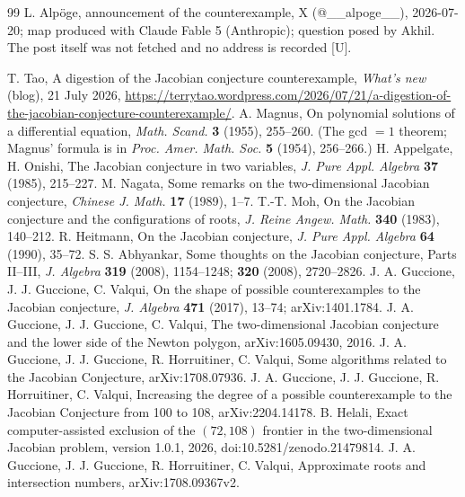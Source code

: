 \documentclass[11pt]{article}
\theoremstyle{remark}
\begin{document}
\small
\begin{thebibliography}{99}
 L. Alp\"oge, announcement of the counterexample, X (@\_\_alpoge\_\_),
2026-07-20; map produced with Claude Fable 5 (Anthropic); question posed by Akhil. The post itself was not fetched and no address is recorded [U]. %
 \raggedright T. Tao, A digestion of the Jacobian conjecture counterexample, \emph{What's new} (blog), 21 July
2026, \url{https://terrytao.wordpress.com/2026/07/21/a-digestion-of-the-jacobian-conjecture-counterexample/}.
 A. Magnus, On polynomial solutions of a differential equation,
\emph{Math. Scand.} \textbf{3} (1955), 255--260. (The gcd $=1$ theorem; Magnus' formula is
in \emph{Proc. Amer. Math. Soc.} \textbf{5} (1954), 256--266.)
 H. Appelgate, H. Onishi, The Jacobian conjecture in two
variables, \emph{J. Pure Appl. Algebra} \textbf{37} (1985), 215--227.
 M. Nagata, Some remarks on the two-dimensional Jacobian conjecture,
\emph{Chinese J. Math.} \textbf{17} (1989), 1--7.
 T.-T. Moh, On the Jacobian conjecture and the configurations of roots,
\emph{J. Reine Angew. Math.} \textbf{340} (1983), 140--212.
 R. Heitmann, On the Jacobian conjecture, \emph{J. Pure Appl.
Algebra} \textbf{64} (1990), 35--72.
 S. S. Abhyankar, Some thoughts on the Jacobian conjecture, Parts
II--III, \emph{J. Algebra} \textbf{319} (2008), 1154--1248; \textbf{320} (2008),
2720--2826.
 J. A. Guccione, J. J. Guccione, C. Valqui, On the shape of possible
counterexamples to the Jacobian conjecture, \emph{J. Algebra} \textbf{471} (2017), 13--74;
arXiv:1401.1784.
 J. A. Guccione, J. J. Guccione, C. Valqui, The two-dimensional Jacobian
conjecture and the lower side of the Newton polygon, arXiv:1605.09430, 2016.
 J. A. Guccione, J. J. Guccione, R. Horruitiner, C. Valqui, Some
algorithms related to the Jacobian Conjecture, arXiv:1708.07936.
 J. A. Guccione, J. J. Guccione, R. Horruitiner, C. Valqui, Increasing
the degree of a possible counterexample to the Jacobian Conjecture from 100 to 108,
arXiv:2204.14178.
 B. Helali, Exact computer-assisted exclusion of the $(72,108)$ frontier in the
two-dimensional Jacobian problem, version 1.0.1, 2026, doi:10.5281/zenodo.21479814.
 J. A. Guccione, J. J. Guccione, R. Horruitiner, C. Valqui,
Approximate roots and intersection numbers, arXiv:1708.09367v2.

\end{thebibliography}
\end{document}

